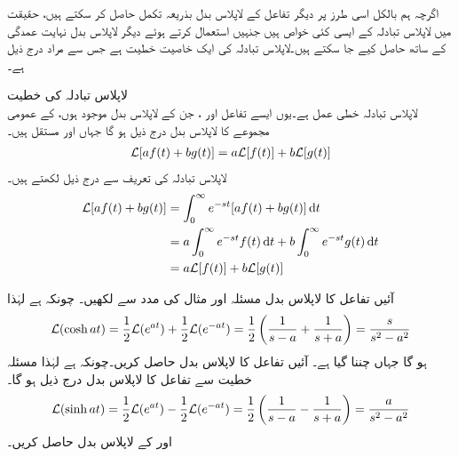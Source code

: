 اگرچہ ہم بالکل اسی طرز پر دیگر تفاعل کے لاپلاس بدل بذریعہ تکمل حاصل کر سکتے ہیں، حقیقت میں لاپلاس تبادلہ کے ایسی کئی خواص ہیں جنہیں استعمال کرتے ہوئے دیگر لاپلاس بدل نہایت عمدگی کے ساتھ حاصل کیے جا سکتے ہیں۔لاپلاس تبادلہ کی ایک خاصیت  خطیت ہے جس سے مراد درج ذیل ہے۔

\quad لاپلاس تبادلہ کی خطیت\\
لاپلاس تبادلہ خطی عمل ہے۔یوں ایسے تفاعل  اور ، جن کے لاپلاس بدل موجود ہوں، کے عمومی مجموعے کا لاپلاس بدل درج ذیل ہو گا جہاں  اور  مستقل ہیں۔
\begin{align*}
\mathcal{L}[af(t)+bg(t)]=a\mathcal{L}[f(t)]+b\mathcal{L}[g(t)]
\end{align*}
لاپلاس تبادلہ کی تعریف سے درج ذیل لکھتے ہیں۔
\begin{align*}
\Laplace[af(t)+bg(t)]&=\int_{0}^{\infty}e^{-st}[af(t)+bg(t)]\dif t\\
&=a\int_{0}^{\infty}e^{-st}f(t)\dif t+b\int_{0}^{\infty}e^{-st}g(t) \dif t\\
&=a\Laplace[f(t)]+b\Laplace[g(t)]
\end{align*}

آئیں تفاعل  کا لاپلاس بدل مسئلہ  اور مثال  کی مدد سے لکھیں۔
 چونکہ  ہے لہٰذا 
\begin{align*}
\mathcal{L}(\cosh at)=\frac{1}{2}\mathcal{L}(e^{at})+\frac{1}{2}\mathcal{L}(e^{-at})=\frac{1}{2}\left(\frac{1}{s-a}+\frac{1}{s+a}\right)=\frac{s}{s^2-a^2}
\end{align*}
ہو گا جہاں  چننا گیا ہے۔
آئیں تفاعل  کا لاپلاس بدل حاصل کریں۔چونکہ  ہے لہٰذا مسئلہ خطیت سے تفاعل کا لاپلاس بدل درج ذیل ہو گا۔
\begin{align*}
\mathcal{L}(\sinh at)=\frac{1}{2}\mathcal{L}(e^{at})-\frac{1}{2}\mathcal{L}(e^{-at})=\frac{1}{2}\left(\frac{1}{s-a}-\frac{1}{s+a}\right)=\frac{a}{s^2-a^2}
\end{align*}
 اور  کے لاپلاس بدل حاصل کریں۔

